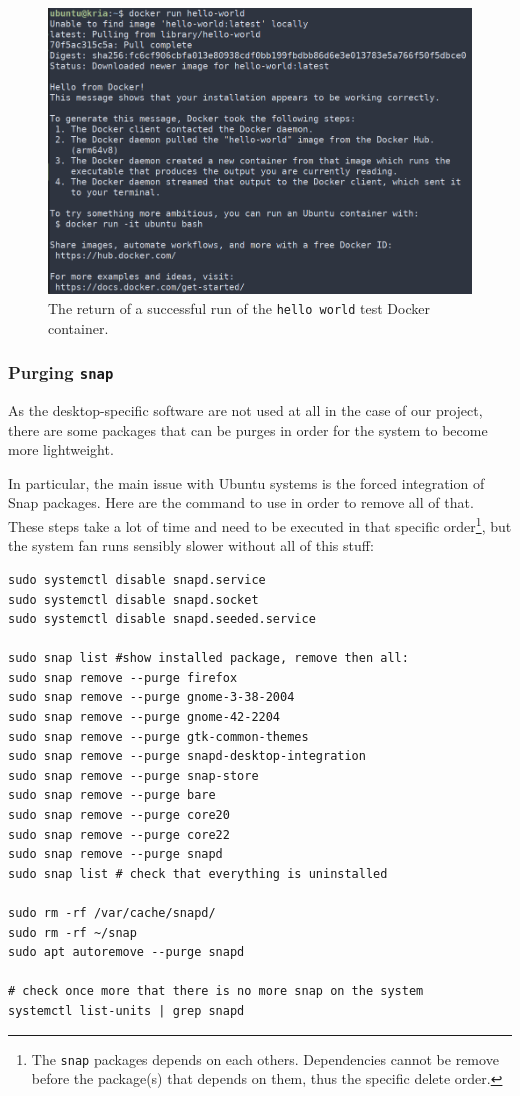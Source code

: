 \documentclass[10pt]{article}
\begin{document}
\begin{figure}[htbp]
\centering
\includegraphics[width=.7\textwidth]{img/hello-docker.png}
\caption{\label{fig:org44f3b61}The return of a successful run of the \texttt{hello world} test Docker container.}
\end{figure}

\subsubsection{Purging \texttt{snap}}
\label{sec:orge45cdb7}
As the desktop-specific software are not used at all in the case
of our project, there are some packages that can be purges in order for the
system to become more lightweight.

In particular, the main issue with Ubuntu systems is the forced integration of
Snap packages. Here are the command to use in order to remove all of that.
These steps take a lot of time and need to be executed in that specific order\footnote{The \texttt{snap} packages depends on each others. Dependencies
cannot be remove before the package(s) that depends on them,
thus the specific delete order.},
but the system fan runs sensibly slower without all of this stuff:

\begin{verbatim}
sudo systemctl disable snapd.service
sudo systemctl disable snapd.socket
sudo systemctl disable snapd.seeded.service

sudo snap list #show installed package, remove then all:
sudo snap remove --purge firefox
sudo snap remove --purge gnome-3-38-2004
sudo snap remove --purge gnome-42-2204
sudo snap remove --purge gtk-common-themes
sudo snap remove --purge snapd-desktop-integration
sudo snap remove --purge snap-store
sudo snap remove --purge bare
sudo snap remove --purge core20
sudo snap remove --purge core22
sudo snap remove --purge snapd
sudo snap list # check that everything is uninstalled

sudo rm -rf /var/cache/snapd/
sudo rm -rf ~/snap
sudo apt autoremove --purge snapd

# check once more that there is no more snap on the system
systemctl list-units | grep snapd 
\end{verbatim}
\end{document}
